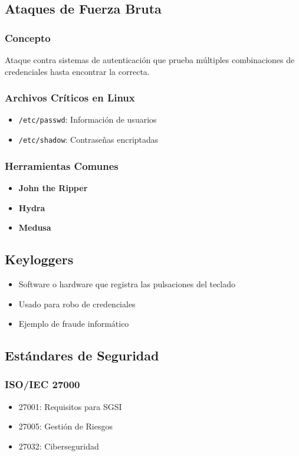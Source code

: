 \documentclass[12pt,a4paper]{article}
\begin{document}
\subsection{Ataques de Fuerza Bruta}
\subsubsection{Concepto}
Ataque contra sistemas de autenticación que prueba múltiples combinaciones de credenciales hasta encontrar la correcta.

\subsubsection{Archivos Críticos en Linux}
\begin{itemize}
    \item \texttt{/etc/passwd}: Información de usuarios
    \item \texttt{/etc/shadow}: Contraseñas encriptadas
\end{itemize}

\subsubsection{Herramientas Comunes}
\begin{itemize}
    \item \textbf{John the Ripper}
    \item \textbf{Hydra}
    \item \textbf{Medusa}
\end{itemize}

\subsection{Keyloggers}
\begin{itemize}
    \item Software o hardware que registra las pulsaciones del teclado
    \item Usado para robo de credenciales
    \item Ejemplo de fraude informático
\end{itemize}

\subsection{Estándares de Seguridad}
\subsubsection{ISO/IEC 27000}
\begin{itemize}
    \item 27001: Requisitos para SGSI
    \item 27005: Gestión de Riesgos
    \item 27032: Ciberseguridad
\end{itemize}
\end{document}
